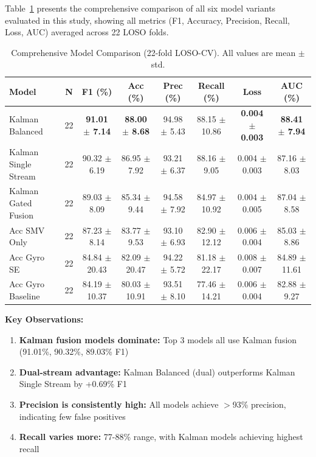 \documentclass{article}
\begin{document}
Table~\ref{tab:comprehensive_model} presents the comprehensive comparison of all six model variants evaluated in this study, showing all metrics (F1, Accuracy, Precision, Recall, Loss, AUC) averaged across 22 LOSO folds.

\begin{table}[htbp]
\centering
\caption{Comprehensive Model Comparison (22-fold LOSO-CV). All values are mean $\pm$ std.}
\label{tab:comprehensive_model}
\small
\begin{tabular}{lccccccc}
\toprule
\textbf{Model} & \textbf{N} & \textbf{F1 (\%)} & \textbf{Acc (\%)} & \textbf{Prec (\%)} & \textbf{Recall (\%)} & \textbf{Loss} & \textbf{AUC (\%)} \\
\midrule
Kalman Balanced & 22 & \textbf{91.01 $\pm$ 7.14} & \textbf{88.00 $\pm$ 8.68} & 94.98 $\pm$ 5.43 & 88.15 $\pm$ 10.86 & \textbf{0.004 $\pm$ 0.003} & \textbf{88.41 $\pm$ 7.94} \\
Kalman Single Stream & 22 & 90.32 $\pm$ 6.19 & 86.95 $\pm$ 7.92 & 93.21 $\pm$ 6.37 & 88.16 $\pm$ 9.05 & 0.004 $\pm$ 0.003 & 87.16 $\pm$ 8.03 \\
Kalman Gated Fusion & 22 & 89.03 $\pm$ 8.09 & 85.34 $\pm$ 9.44 & 94.58 $\pm$ 7.92 & 84.97 $\pm$ 10.92 & 0.004 $\pm$ 0.005 & 87.04 $\pm$ 8.58 \\
Acc SMV Only & 22 & 87.23 $\pm$ 8.14 & 83.77 $\pm$ 9.53 & 93.10 $\pm$ 6.93 & 82.90 $\pm$ 12.12 & 0.006 $\pm$ 0.004 & 85.03 $\pm$ 8.86 \\
Acc Gyro SE & 22 & 84.84 $\pm$ 20.43 & 82.09 $\pm$ 20.47 & 94.22 $\pm$ 5.72 & 81.18 $\pm$ 22.17 & 0.008 $\pm$ 0.007 & 84.89 $\pm$ 11.61 \\
Acc Gyro Baseline & 22 & 84.19 $\pm$ 10.37 & 80.03 $\pm$ 10.91 & 93.51 $\pm$ 8.10 & 77.46 $\pm$ 14.21 & 0.006 $\pm$ 0.004 & 82.88 $\pm$ 9.27 \\
\bottomrule
\end{tabular}
\end{table}

\textbf{Key Observations:}
\begin{enumerate}
    \item \textbf{Kalman fusion models dominate:} Top 3 models all use Kalman fusion (91.01\%, 90.32\%, 89.03\% F1)
    \item \textbf{Dual-stream advantage:} Kalman Balanced (dual) outperforms Kalman Single Stream by +0.69\% F1
    \item \textbf{Precision is consistently high:} All models achieve $>$93\% precision, indicating few false positives
    \item \textbf{Recall varies more:} 77-88\% range, with Kalman models achieving highest recall
\end{enumerate}
\end{document}
